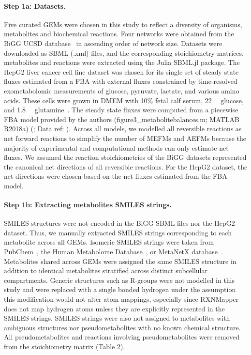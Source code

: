 \documentclass[12pt]{article}
\begin{document}
\paragraph{Step 1a: Datasets.}

Five curated GEMs were chosen in this study to reflect a diversity of
organisms, metabolites and biochemical reactions. Four networks were
obtained from the BiGG UCSD database~\citep{KingZacharyA2016BMAp} in
ascending order of network size. Datasets were downloaded as SBML (.xml)
files, and the corresponding stoichiometry matrices, metabolites and
reactions were extracted using the Julia SBML.jl package. The HepG2 liver
cancer cell line dataset was chosen for its single set of steady state
fluxes estimated from a FBA with external fluxes constrained by
time-resolved exometabolomic measurements of glucose, pyruvate, lactate,
and various amino acids. These cells were grown in DMEM with 10\% fetal
calf serum, 22\SI{}{\milli\molar} glucose, and 1.8\SI{}{\milli\molar}
glutamine~\citep{NilssonAvlant2020Qaoa}. The steady state fluxes were
computed from a piecewise FBA model provided by the authors
(figure3\_metabolitebalances.m; MATLAB R2018a)
(\citealt{NilssonAvlant2020Qaoa}; Data ref:
\citealt{NilssonAvlant2020QaoaDATASET}). Across all models, we modelled
all reversible reactions as net forward reactions to simplify the number
of MEFMs and AEFMs because the majority of experimental and
computational methods can only estimate net fluxes. We assumed the
reaction stoichiometries of the BiGG datasets represented the canonical
net directions of all reversible reactions. For the HepG2 dataset, the net
directions were chosen based on the net fluxes estimated from the FBA
model.

\paragraph{Step 1b: Extracting metabolites SMILES strings.}

SMILES structures were not encoded in the BiGG SBML files nor the HepG2
dataset. Thus, we manually extracted SMILES strings corresponding to each
metabolite across all GEMs. Isomeric SMILES strings were taken from
PubChem~\citep{KimSunghwan2023P2u}, the Human Metabolome
Database~\citep{WishartDavidS2022H5tH}, or MetaNetX
database~\citep{MorettiSebastien2021Munf}. Metabolites shared across GEMs
were assigned the same SMILES structure in addition to identical
metabolites stratified across distinct subcellular compartments. Generic
structures such as R-groups were not modelled in this study and were
replaced with a single bonded hydrogen under the assumption this
modification would not alter atom mappings, especially since RXNMapper
does not map hydrogen atoms unless they are explicitly represented in the
SMILES strings. SMILES strings were also not assigned to metabolites with
ambiguous structures nor pseudometabolites with no known chemical
structure. All pseudometabolites and reactions involving pseudometabolites
were removed from the stoichiometry matrix (Table 2).
\end{document}
